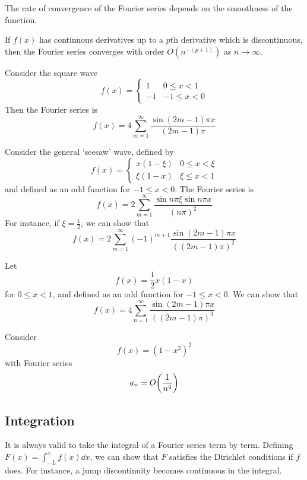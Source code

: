 \noindent The rate of convergence of the Fourier series depends on the smoothness of the function.
\begin{theorem}
	If \( f(x) \) has continuous derivatives up to a \( p \)th derivative which is discontinuous, then the Fourier series converges with order \( O(n^{-(p+1)}) \) as \( n \to \infty \).
\end{theorem}
\begin{example}[\( p = 0 \)]
	Consider the square wave
	\[
		f(x) = \begin{cases}
			1  & 0 \leq x < 1  \\
			-1 & -1 \leq x < 0
		\end{cases}
	\]
	Then the Fourier series is
	\[
		f(x) = 4 \sum_{m=1}^\infty \frac{\sin (2m-1)\pi x}{(2m-1)\pi}
	\]
\end{example}
\begin{example}[\( p = 1 \)]
	Consider the general `seesaw' wave, defined by
	\[
		f(x) = \begin{cases}
			x(1 - \xi) & 0 \leq x < \xi \\
			\xi(1 - x) & \xi \leq x < 1
		\end{cases}
	\]
	and defined as an odd function for \( -1 \leq x < 0 \).
	The Fourier series is
	\[
		f(x) = 2 \sum_{m=1}^\infty \frac{\sin n\pi \xi \sin n\pi x}{(n \pi)^2}
	\]
	For instance, if \( \xi = \frac{1}{2} \), we can show that
	\[
		f(x) = 2 \sum_{m=1}^\infty (-1)^{m+1} \frac{\sin (2m-1)\pi x}{((2m-1)\pi)^2}
	\]
\end{example}
\begin{example}[\( p = 2 \)]
	Let
	\[
		f(x) = \frac{1}{2} x(1-x)
	\]
	for \( 0 \leq x < 1 \), and defined as an odd function for \( -1 \leq x < 0 \).
	We can show that
	\[
		f(x) = 4\sum_{n=1}^\infty \frac{\sin(2m - 1)\pi x}{((2m-1)\pi)^3}
	\]
\end{example}
\begin{example}[\( p = 3 \)]
	Consider
	\[
		f(x) = (1-x^2)^2
	\]
	with Fourier series
	\[
		a_n = O\qty(\frac{1}{n^4})
	\]
\end{example}

\subsection{Integration}
It is always valid to take the integral of a Fourier series term by term.
Defining \( F(x) = \int_{-L}^x f(x) \dd{x} \), we can show that \( F \) satisfies the Dirichlet conditions if \( f \) does.
For instance, a jump discontinuity becomes continuous in the integral.

